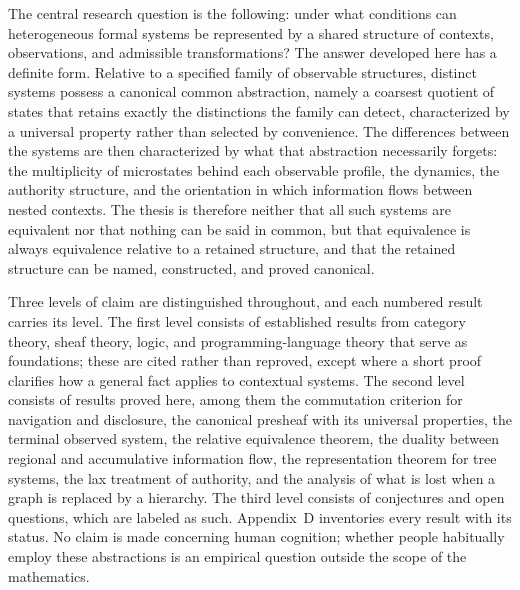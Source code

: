 \documentclass[11pt]{article}
\theoremstyle{definition}
\theoremstyle{remark}
\begin{document}
The central research question is the following: under what conditions can heterogeneous formal systems be represented by a shared structure of contexts, observations, and admissible transformations? The answer developed here has a definite form. Relative to a specified family of observable structures, distinct systems possess a canonical common abstraction, namely a coarsest quotient of states that retains exactly the distinctions the family can detect, characterized by a universal property rather than selected by convenience. The differences between the systems are then characterized by what that abstraction necessarily forgets: the multiplicity of microstates behind each observable profile, the dynamics, the authority structure, and the orientation in which information flows between nested contexts. The thesis is therefore neither that all such systems are equivalent nor that nothing can be said in common, but that equivalence is always equivalence relative to a retained structure, and that the retained structure can be named, constructed, and proved canonical.

Three levels of claim are distinguished throughout, and each numbered result carries its level. The first level consists of established results from category theory, sheaf theory, logic, and programming-language theory that serve as foundations; these are cited rather than reproved, except where a short proof clarifies how a general fact applies to contextual systems. The second level consists of results proved here, among them the commutation criterion for navigation and disclosure, the canonical presheaf with its universal properties, the terminal observed system, the relative equivalence theorem, the duality between regional and accumulative information flow, the representation theorem for tree systems, the lax treatment of authority, and the analysis of what is lost when a graph is replaced by a hierarchy. The third level consists of conjectures and open questions, which are labeled as such. Appendix~D inventories every result with its status. No claim is made concerning human cognition; whether people habitually employ these abstractions is an empirical question outside the scope of the mathematics.
\end{document}
